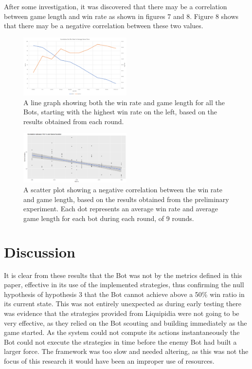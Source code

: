 \documentclass[journal]{IEEEtran}
\begin{document}
	After some investigation, it was discovered that there may be a correlation between game length and win rate as shown in figures 7 and 8. Figure 8 shows that there may be a negative correlation between these two values.
	\begin{figure}
		\centering
		\includegraphics[width=0.5\textwidth]{WinTimeLineWithBot}
		\caption{A line graph showing both the win rate and game length for all the Bots, starting with the highest win rate on the left, based on the results obtained from each round.}
		\label{Fig7}
	\end{figure}
	\begin{figure}
		\centering
		\includegraphics[width=0.5\textwidth]{ScatterWinvsDurLine}
		\caption{A scatter plot showing a negative correlation between the win rate and game length, based on the results obtained from the preliminary experiment. Each dot represents an average win rate and average game length for each bot during each round, of 9 rounds.}
		\label{Fig8}
	\end{figure}
	\section{Discussion}
	It is clear from these results that the Bot was not by the metrics defined in this paper, effective in its use of the implemented strategies, thus confirming the null hypothesis of hypothesis 3 that the Bot cannot achieve above a 50\% win ratio in its current state. This was not entirely unexpected as during early testing there was evidence that the strategies provided from Liquipidia were not going to be very effective, as they relied on the Bot scouting and building immediately as the game started. As the system could not compute its actions instantaneously the Bot could not execute the strategies in time before the enemy Bot had built a larger force. The framework was too slow and needed altering, as this was not the focus of this research it would have been an improper use of resources.
	
\end{document}
